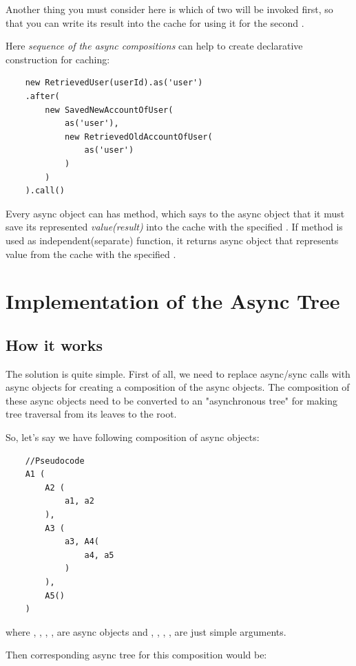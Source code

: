 \documentclass{article}
\begin{document}
Another thing you must consider here is which of two  will be invoked first, so that you can write its result into the cache for using it for the second .

Here \textit{sequence of the async compositions} can help to create declarative construction for caching:

\begin{verbatim}
    new RetrievedUser(userId).as('user')
    .after(
        new SavedNewAccountOfUser(
            as('user'),
            new RetrievedOldAccountOfUser(
                as('user')
            )
        )
    ).call()
\end{verbatim}

Every async object can has  method, which says to the async object that it must save its represented \textit{value(result)} into the cache with the specified . If  method is used as independent(separate) function, it returns async object that represents value from the cache with the specified .

\section{Implementation of the Async Tree}

\subsection{How it works}

The solution is quite simple. First of all, we need to replace async/sync calls with async objects for creating a composition of the async objects. The composition of these async objects need to be converted to an "asynchronous tree" for making tree traversal from its leaves to the root.

So, let's say we have following composition of async objects:

\begin{verbatim}
    //Pseudocode
    A1 (
        A2 (
            a1, a2
        ),
        A3 (
            a3, A4(
                a4, a5
            )
        ),
        A5()
    )
\end{verbatim}
where , , , ,  are async objects and , , , ,  are just simple arguments. 

Then corresponding async tree for this composition would be:
\end{document}
